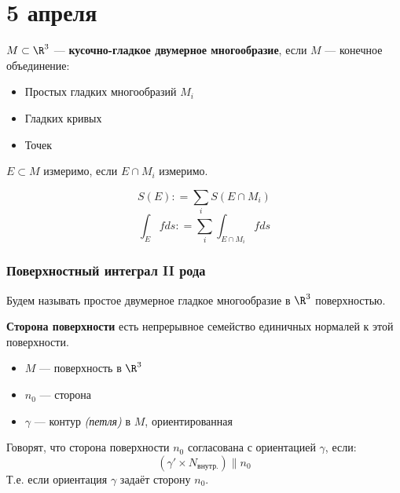 \chapter{5 апреля}

\begin{definition}
    \(M \subset \R^3\) --- \textbf{кусочно-гладкое двумерное многообразие}, если \(M\) --- конечное объединение:
    \begin{itemize}
        \item Простых гладких многообразий \(M_i\)
        \item Гладких кривых
        \item Точек
    \end{itemize}
\end{definition}

\begin{definition}
    \(E \subset M\) измеримо, если \(E \cap M_i\) измеримо.

    \[S(E) : = \sum_i S(E \cap M_i)\]
    \[\int_E fds : = \sum_i \int_{E\cap M_i} f ds\]
\end{definition}

\subsection{Поверхностный интеграл II рода}

\begin{obozn}
    Будем называть простое двумерное гладкое многообразие в \(\R^3\) поверхностью.
\end{obozn}

\begin{definition}
    \textbf{Сторона поверхности} есть непрерывное семейство единичных нормалей к этой поверхности.
\end{definition}

\begin{definition}\itemfix
    \begin{itemize}
        \item \(M\) --- поверхность в \(\R^3\)
        \item \(n_0\) --- сторона %
        \item \(\gamma\) --- контур \textit{(петля)} в \(M\), ориентированная
    \end{itemize}

    Говорят, что сторона поверхности \(n_0\) согласована с ориентацией \(\gamma\), если:
    \[(\gamma' \times N_{\text{внутр.}}) \parallel n_0\]
    Т.е. если ориентация \(\gamma\) задаёт сторону \(n_0\).
\end{definition}

